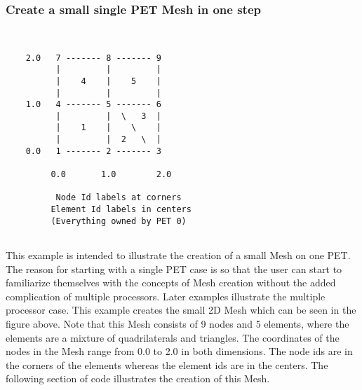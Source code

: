 
  \subsubsection{Create a small single PET Mesh in one step}\label{sec:mesh:1pet1step}
  \begin{minipage}{\linewidth} 
  \begin{verbatim}
  
   
    2.0   7 ------- 8 ------- 9
          |         |         |
          |    4    |    5    |
          |         |         |
    1.0   4 ------- 5 ------- 6
          |         |  \   3  |
          |    1    |    \    |
          |         |  2   \  |
    0.0   1 ------- 2 ------- 3
  
         0.0       1.0        2.0 
   
          Node Id labels at corners
         Element Id labels in centers
         (Everything owned by PET 0) 
  
  \end{verbatim}
  \end{minipage}
  
   This example is intended to illustrate the creation of a small Mesh on one PET. The reason for starting with a single PET
   case is so that the user can start to familiarize themselves with the concepts of Mesh creation without the added complication of 
   multiple processors. Later examples illustrate the multiple processor case. This example creates the small 2D Mesh which can be 
   seen in the figure above. Note that this Mesh consists of 9 nodes and 5 elements, where the elements are a mixture of 
   quadrilaterals and triangles.  The coordinates of the nodes in the Mesh range from 0.0 to 2.0 in both dimensions. The node ids are 
   in the corners of the elements whereas the element ids are in the centers. The following section of code illustrates the creation of
   this Mesh. 
   

